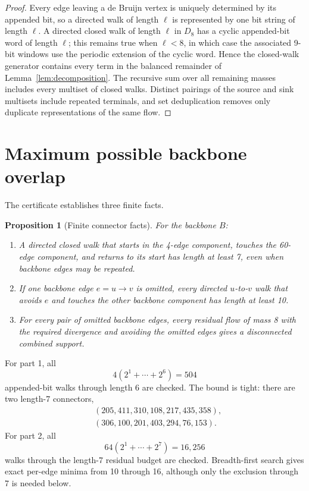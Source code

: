 \documentclass[11pt]{article}
\newtheorem{proposition}[theorem]{Proposition}
\theoremstyle{definition}
\theoremstyle{remark}
\begin{document}
\begin{proof}
Every edge leaving a de Bruijn vertex is uniquely determined by its
appended bit, so a directed walk of length $\ell$ is represented by one
bit string of length $\ell$.  A directed closed walk of length $\ell$ in
$D_8$ has a cyclic appended-bit word of length $\ell$; this remains true
when $\ell<8$, in which case the associated 9-bit windows use the
periodic extension of the cyclic word.  Hence the closed-walk generator
contains every term in the balanced remainder of
Lemma~\ref{lem:decomposition}.  The recursive sum over all remaining
masses includes every multiset of closed walks.  Distinct pairings of
the source and sink multisets include repeated terminals, and set
deduplication removes only duplicate representations of the same flow.
\end{proof}

\section{Maximum possible backbone overlap}

The certificate establishes three finite facts.

\begin{proposition}[Finite connector facts]
\label{prop:finite}
For the backbone $B$:
\begin{enumerate}
\item A directed closed walk that starts in the 4-edge component,
touches the 60-edge component, and returns to its start has length at
least 7, even when backbone edges may be repeated.
\item If one backbone edge $e=u\to v$ is omitted, every directed
$u$-to-$v$ walk that avoids $e$ and touches the other backbone component
has length at least 10.
\item For every pair of omitted backbone edges, every residual flow of
mass 8 with the required divergence and avoiding the omitted edges gives
a disconnected combined support.
\end{enumerate}
\end{proposition}

For part 1, all
\[
  4(2^1+\cdots+2^6)=504
\]
appended-bit walks through length 6 are checked.  The bound is tight:
there are two length-7 connectors,
\[
\begin{split}
  &(205,411,310,108,217,435,358),\\
  &(306,100,201,403,294,76,153).
\end{split}
\]
For part 2, all
\[
  64(2^1+\cdots+2^7)=16{,}256
\]
walks through the length-7 residual budget are checked.  Breadth-first
search gives exact per-edge minima from 10 through 16, although only the
exclusion through 7 is needed below.
\end{document}
